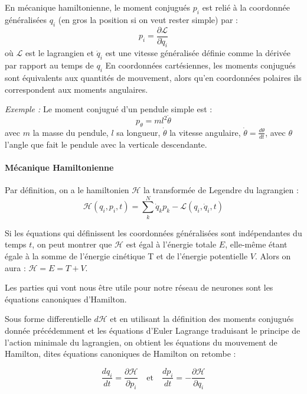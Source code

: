 \documentclass[11pt]{article}
\begin{document}
En mécanique hamiltonienne, le moment conjugués $p_i$ est relié à la coordonnée généralisées $q_i$ (en gros la position si on veut rester simple) par : 
\begin{equation}\label{eq:position}
    p_i = \frac{\partial \mathcal{L}}{\partial \dot q_i}
\end{equation}
où $\mathcal {L}$ est le lagrangien et $\dot {q}_{i}$ est une vitesse généralisée définie comme la dérivée par rapport au temps de $q_{i}$
En coordonnées cartésiennes, les moments conjugués sont équivalents aux quantités de mouvement, alors qu'en coordonnées polaires ils correspondent aux moments angulaires.

\textit{Exemple :} Le moment conjugué d'un pendule simple est : 
\[
p_{\theta} = ml^2 \dot{\theta}
\]
avec $m$ la masse du pendule, $l$ sa longueur, $\dot \theta$ la vitesse angulaire, $\dot \theta = \frac{d \theta}{dt}$, avec $\theta$ l'angle que fait le pendule avec la verticale descendante.

\paragraph{Mécanique Hamiltonienne} 
Par définition, on a le hamiltonien $\mathcal{H}$ la transformée de Legendre du lagrangien :
\begin{equation}\label{eq:hamiltonien}
    \mathcal{H}(q_i, p_i, t) = \sum_{k}^{N} \dot q_k p_k - \mathcal{L}(q_i, \dot q_i, t)
\end{equation}

Si les équations qui définissent les coordonnées généralisées sont indépendantes du temps $t$, on peut montrer que $\mathcal {H}$ est égal à l'énergie totale $E$, elle-même étant égale à la somme de l'énergie cinétique T et de l'énergie potentielle $V$. Alors on aura : $\mathcal{H} = E = T + V$. 

Les parties qui vont nous être utile pour notre réseau de neurones sont les équations canoniques d'Hamilton.  

Sous forme differentielle $d\mathcal{H}$ et en utilisant la définition des moments conjugués donnée précédemment et les équations d'Euler Lagrange traduisant le principe de l'action minimale du lagrangien, on obtient les équations du mouvement de Hamilton, dites équations canoniques de Hamilton on retombe : 

\begin{equation}\label{eq:diff}
    \frac{dq_i}{dt} = \frac{\partial \mathcal{H}}{\partial p_i} \quad \text{et} \quad \frac{dp_i}{dt} = - \frac{\partial \mathcal{H}}{\partial q_i}
\end{equation}
\end{document}
